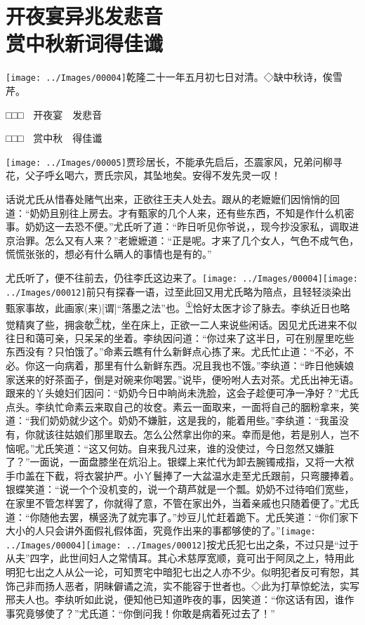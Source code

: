 
\chapter{开夜宴异兆发悲音\\赏中秋新词得佳谶}
{\texttt{[image: ../Images/00004]}\kaishu 乾隆二十一年五月初七日对清。◇缺中秋诗，俟雪芹。}

{\kaishu □□□　开夜宴　发悲音}

{\kaishu □□□　赏中秋　得佳谶}

{\texttt{[image: ../Images/00005]}\kaishu 贾珍居长，不能承先启后，丕震家风，兄弟问柳寻花，父子呼幺喝六，贾氏宗风，其坠地矣。安得不发先灵一叹！}

话说尤氏从惜春处赌气出来，正欲往王夫人处去。跟从的老嬷嬷们因悄悄的回道：``奶奶且别往上房去。才有甄家的几个人来，还有些东西，不知是作什么机密事。奶奶这一去恐不便。''尤氏听了道：``昨日听见你爷说，，现今抄没家私，调取进京治罪。怎么又有人来？''老嬷嬷道：``正是呢。才来了几个女人，气色不成气色，慌慌张张的，想必有什么瞒人的事情也是有的。''

尤氏听了，便不往前去，仍往李氏这边来了。{\texttt{[image: ../Images/00004]}\texttt{[image: ../Images/00012]}\footnotesize \kaishu 前只有探春一语，过至此回又用尤氏略为陪点，且轻轻淡染出甄家事故，此画家{(来)}{[}谓{]}``落墨之法''也。}\href{../Text/part0079_split_000.html\#lnkback_1_a}{\textsuperscript{①}}恰好太医才诊了脉去。李纨近日也略觉精爽了些，拥衾欹\href{../Text/part0079_split_000.html\#lnkback_2_a}{\textsuperscript{②}}枕，坐在床上，正欲一二人来说些闲话。因见尤氏进来不似往日和蔼可亲，只呆呆的坐着。李纨因问道：``你过来了这半日，可在别屋里吃些东西没有？只怕饿了。''命素云瞧有什么新鲜点心拣了来。尤氏忙止道：``不必，不必。你这一向病着，那里有什么新鲜东西。况且我也不饿。''李纨道：``昨日他姨娘家送来的好茶面子，倒是对碗来你喝罢。''说毕，便吩咐人去对茶。尤氏出神无语。跟来的丫头媳妇们因问：``奶奶今日中晌尚未洗脸，这会子趁便可净一净好？''尤氏点头。李纨忙命素云来取自己的妆奁。素云一面取来，一面将自己的胭粉拿来，笑道：``我们奶奶就少这个。奶奶不嫌脏，这是我的，能着用些。''李纨道：``我虽没有，你就该往姑娘们那里取去。怎么公然拿出你的来。幸而是他，若是别人，岂不恼呢。''尤氏笑道：``这又何妨。自来我凡过来，谁的没使过，今日忽然又嫌脏了？''一面说，一面盘膝坐在炕沿上。银蝶上来忙代为卸去腕镯戒指，又将一大袱手巾盖在下截，将衣裳护严。小丫鬟捧了一大盆温水走至尤氏跟前，只弯腰捧着。银蝶笑道：``说一个个没机变的，说一个葫芦就是一个瓢。奶奶不过待咱们宽些，在家里不管怎样罢了，你就得了意，不管在家出外，当着亲戚也只随着便了。''尤氏道：``你随他去罢，横竖洗了就完事了。''炒豆儿忙赶着跪下。尤氏笑道：``你们家下大小的人只会讲外面假礼假体面，究竟作出来的事都够使的了。''{\texttt{[image: ../Images/00004]}\texttt{[image: ../Images/00012]}\footnotesize \kaishu 按尤氏犯七出之条，不过只是``过于从夫''四字，此世间妇人之常情耳。其心术慈厚宽顺，竟可出于阿凤之上，特用此明犯七出之人从公一论，可知贾宅中暗犯七出之人亦不少。似明犯者反可宥恕，其饰己非而扬人恶者，阴昧僻谲之流，实不能容于世者也。◇此为打草惊蛇法，实写邢夫人也。}李纨听如此说，便知他已知道昨夜的事，因笑道：``你这话有因，谁作事究竟够使了？''尤氏道：``你倒问我！你敢是病着死过去了！''

